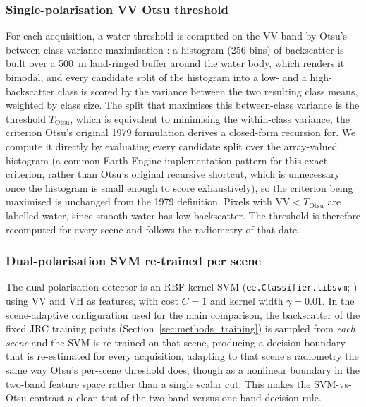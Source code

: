 \subsubsection{Single-polarisation VV Otsu threshold}
\label{sec:methods_otsu}

For each acquisition, a water threshold is computed on the VV band by Otsu's
between-class-variance maximisation \citep{Otsu1979}: a histogram (256 bins)
of backscatter is built over a 500~m land-ringed buffer around the water
body, which renders it bimodal, and every candidate split of the histogram
into a low- and a high-backscatter class is scored by the variance between
the two resulting class means, weighted by class size. The split that
maximises this between-class variance is the threshold $T_{\text{Otsu}}$,
which is equivalent
to minimising the within-class variance, the criterion Otsu's original 1979
formulation derives a closed-form recursion for. We compute it directly by
evaluating every candidate split over the array-valued histogram (a common
Earth Engine implementation pattern for this exact criterion, rather than
Otsu's original recursive shortcut, which is unnecessary once the histogram
is small enough to score exhaustively), so the criterion being maximised is
unchanged from the 1979 definition. Pixels with $\text{VV} < T_{\text{Otsu}}$
are labelled water, since smooth water has low backscatter. The threshold is
therefore recomputed for every scene and follows the radiometry of that date.

\subsubsection{Dual-polarisation SVM re-trained per scene}
\label{sec:methods_svm}

The dual-polarisation detector is an RBF-kernel SVM
(\texttt{ee.Classifier.libsvm}; \citealp{ChangLin2011}) using VV and VH as
features, with cost $C=1$ and kernel width $\gamma=0.01$. In the scene-adaptive
configuration used for the main comparison, the backscatter of the fixed JRC
training points (Section~\ref{sec:methods_training}) is sampled from
\emph{each scene} and the SVM is re-trained on that scene, producing a
decision boundary that is re-estimated for every acquisition, adapting to
that scene's radiometry the same way Otsu's per-scene threshold does, though
as a nonlinear boundary in the two-band feature space rather than a single
scalar cut. This makes the SVM-vs-Otsu contrast a clean test of the two-band
versus one-band decision rule.

